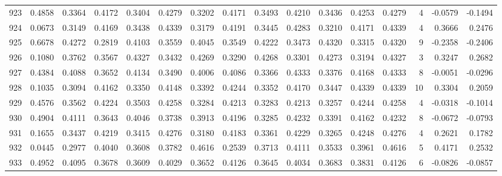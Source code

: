 \begin{tabular}{lrrrrrrrrrrrrrrr}
923 &      0.4858 &  0.3364 &  0.4172 &  0.3404 &  0.4279 &  0.3202 &  0.4171 &  0.3493 &  0.4210 &  0.3436 &   0.4253 &     0.4279 &      4 &                   -0.0579 &                    -0.1494 \\
924 &      0.0673 &  0.3149 &  0.4169 &  0.3438 &  0.4339 &  0.3179 &  0.4191 &  0.3445 &  0.4283 &  0.3210 &   0.4171 &     0.4339 &      4 &                    0.3666 &                     0.2476 \\
925 &      0.6678 &  0.4272 &  0.2819 &  0.4103 &  0.3559 &  0.4045 &  0.3549 &  0.4222 &  0.3473 &  0.4320 &   0.3315 &     0.4320 &      9 &                   -0.2358 &                    -0.2406 \\
926 &      0.1080 &  0.3762 &  0.3567 &  0.4327 &  0.3432 &  0.4269 &  0.3290 &  0.4268 &  0.3301 &  0.4273 &   0.3194 &     0.4327 &      3 &                    0.3247 &                     0.2682 \\
927 &      0.4384 &  0.4088 &  0.3652 &  0.4134 &  0.3490 &  0.4006 &  0.4086 &  0.3366 &  0.4333 &  0.3376 &   0.4168 &     0.4333 &      8 &                   -0.0051 &                    -0.0296 \\
928 &      0.1035 &  0.3094 &  0.4162 &  0.3350 &  0.4148 &  0.3392 &  0.4244 &  0.3352 &  0.4170 &  0.3447 &   0.4339 &     0.4339 &     10 &                    0.3304 &                     0.2059 \\
929 &      0.4576 &  0.3562 &  0.4224 &  0.3503 &  0.4258 &  0.3284 &  0.4213 &  0.3283 &  0.4213 &  0.3257 &   0.4244 &     0.4258 &      4 &                   -0.0318 &                    -0.1014 \\
930 &      0.4904 &  0.4111 &  0.3643 &  0.4046 &  0.3738 &  0.3913 &  0.4196 &  0.3285 &  0.4232 &  0.3391 &   0.4162 &     0.4232 &      8 &                   -0.0672 &                    -0.0793 \\
931 &      0.1655 &  0.3437 &  0.4219 &  0.3415 &  0.4276 &  0.3180 &  0.4183 &  0.3361 &  0.4229 &  0.3265 &   0.4248 &     0.4276 &      4 &                    0.2621 &                     0.1782 \\
932 &      0.0445 &  0.2977 &  0.4040 &  0.3608 &  0.3782 &  0.4616 &  0.2539 &  0.3713 &  0.4111 &  0.3533 &   0.3961 &     0.4616 &      5 &                    0.4171 &                     0.2532 \\
933 &      0.4952 &  0.4095 &  0.3678 &  0.3609 &  0.4029 &  0.3652 &  0.4126 &  0.3645 &  0.4034 &  0.3683 &   0.3831 &     0.4126 &      6 &                   -0.0826 &                    -0.0857 \\

\end{tabular}
